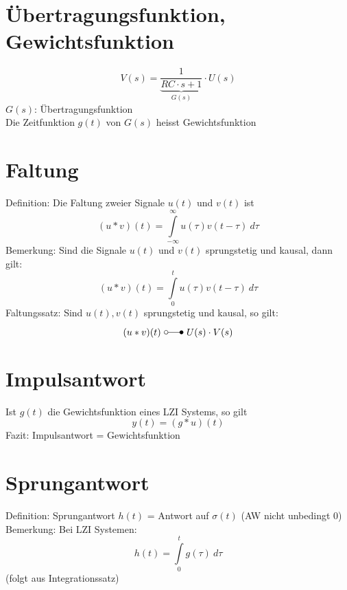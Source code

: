 \section{Übertragungsfunktion, Gewichtsfunktion}
\[ 
    V(s) = \underbrace{\frac{1}{RC \cdot s + 1}}_{G(s)} \cdot U(s) 
\]
$G(s)$: Übertragungsfunktion\\
Die Zeitfunktion $g(t)$ von $G(s)$ heisst Gewichtsfunktion\\

\section{Faltung}
Definition: Die Faltung zweier Signale $u(t)$ und $v(t)$ ist
\[ 
    (u * v)(t) = \int\limits_{-\infty}^{\infty} u(\tau) v(t - \tau) ~ d \tau 
\]
Bemerkung: Sind die Signale $u(t)$ und $v(t)$ sprungstetig und kausal, dann
gilt:
\[ 
    (u * v)(t) = \int\limits_{0}^{t} u(\tau) v(t - \tau) ~ d \tau 
\]
Faltungssatz:
Sind $u(t), v(t)$ sprungstetig und kausal, so gilt:
\[ 
    (u * v) (t) ~ \laplace ~ U(s) \cdot V(s) 
\]

\section{Impulsantwort}
Ist $g(t)$ die Gewichtsfunktion eines LZI Systems, so gilt
\[ 
    y(t) = (g * u)(t) 
\]
Fazit: Impulsantwort = Gewichtsfunktion

\section{Sprungantwort}
Definition: Sprungantwort $h(t)$ = Antwort auf $\sigma(t)$
(AW nicht unbedingt 0) \\
Bemerkung: Bei LZI Systemen:
\[ 
    h(t) = \int\limits_{0}^{t} g(\tau) ~d \tau 
\]
(folgt aus Integrationssatz)
